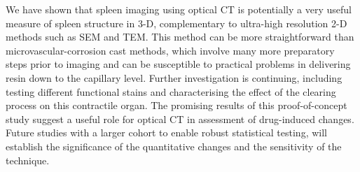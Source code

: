 \documentclass[12pt]{article}
\begin{document}
We have shown that spleen imaging using optical CT is potentially a very useful measure of spleen structure in 3-D, complementary to ultra-high resolution 2-D methods such as SEM and TEM. This method can be more straightforward than microvascular-corrosion cast methods, which involve many more preparatory steps prior to imaging and can be susceptible to practical problems in delivering resin down to the capillary level. Further investigation is continuing, including testing different functional stains and characterising the effect of the clearing process on this contractile organ. The promising results of this proof-of-concept study suggest a useful role for optical CT in assessment of drug-induced changes. Future studies with a larger cohort to enable robust statistical testing, will establish the significance of the quantitative changes and the sensitivity of the technique. 


\end{document}
